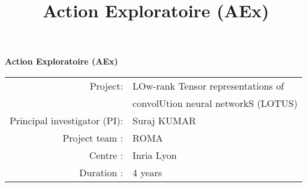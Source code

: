 \documentclass[11pt]{article}
\title{Action Exploratoire (AEx)}
\author{}
\date{}
\newcommand{\prname}{LOTUS\xspace}
\begin{document}

   \begin{center}
		\Large\textbf{Action Exploratoire (AEx)}
	\end{center}

	\begin{tabular}{rl}
		Project: & {\sc LOw-rank Tensor representations of}\\
		& {\sc convolUtion neural networkS (LOTUS)}\\
		Principal investigator (PI): & Suraj KUMAR\\
		Project team :&  ROMA\\
		Centre :& Inria Lyon\\
		Duration :& 4 years
	\end{tabular}

\end{document}
